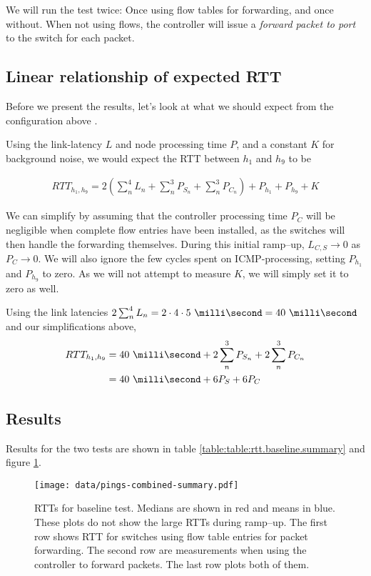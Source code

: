 We will run the test twice: Once using flow tables for forwarding, and once
without.  When not using flows, the controller will issue a \textit{forward
packet to port} to the switch for each packet.

\subsection{Linear relationship of expected \acs{RTT}}

Before we present the results, let's look at what we should expect from the
configuration above \cite{DBLP:conf/cnsm/PhemiusB13}.

Using the link-latency $L$ and node processing time $P$, and a constant $K$
for background noise, we would expect the \acf{RTT} between $h_1$ and $h_9$
to be

\begin{gather}
  RTT_{h_1, h_9} = 2\left( \sum_n^4 L_n + \sum_n^3 P_{S_n} + \sum_n^3 P_{C_n} \right) + P_{h_1} + P_{h_9} + K
  \label{equation:baseline.rtt}
\end{gather}

We can simplify by assuming that the controller processing time $P_C$ will
be negligible when complete flow entries have been installed, as the
switches will then handle the forwarding themselves.  During this initial
ramp--up, $L_{C,S} \to 0$ as $P_C \to 0$.  We will also ignore the few
cycles spent on ICMP-processing, setting $P_{h_1}$ and $P_{h_9}$ to zero.
As we will not attempt to measure $K$, we will simply set it to zero as
well.

Using the link latencies $2\sum_n^4 L_n = 2\cdot4\cdot\ms{5} = \ms{40}$
and our simplifications above,
\begin{align}
  RTT_{h_1,h_9} &= \ms{40} + 2\sum_n^3 P_{S_n} + 2\sum_n^3 P_{C_n} \\
                &= \ms{40} + 6P_S + 6P_C
  \label{equation:expected.baseline.rtt}
\end{align}

\subsection{Results}

Results for the two tests are shown in table
\ref{table:table:rtt.baseline.summary} and figure
\ref{figure:baseline.combined.summary.plot}.

\begin{figure}
  \centering
  \texttt{[image: data/pings-combined-summary.pdf]}
  \caption{\acs{RTT}s for baseline test.  Medians are shown in red and means
    in blue.
    These plots do not show the large \acs{RTT}s during ramp--up.
    The first row shows \acs{RTT} for switches using flow table entries for
    packet forwarding.  The second row are measurements when using the
    controller to forward packets.  The last row plots both of them.}
  \label{figure:baseline.combined.summary.plot}
\end{figure}

